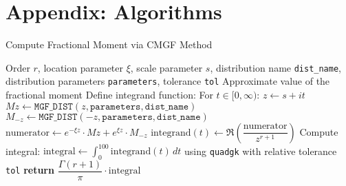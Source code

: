 \section{Appendix: Algorithms}\label{s:app_alg}
\begin{center}
\begin{minipage}{0.9 \textwidth}
\begin{algorithm}[H]
\caption{Compute Fractional Moment via CMGF Method}
\label{alg:cmgf_dist}
\begin{algorithmic}[1]
\REQUIRE Order $r$, location parameter $\xi$, scale parameter $s$, distribution name \texttt{dist\_name}, distribution parameters \texttt{parameters}, tolerance \texttt{tol}
\ENSURE Approximate value of the fractional moment
\STATE Define integrand function:
\STATE \hspace{1em} For $t \in [0, \infty)$:
\STATE \hspace{2em} $z \leftarrow s + it$
\STATE \hspace{2em} $Mz \leftarrow \texttt{MGF\_DIST}(z, \texttt{parameters}, \texttt{dist\_name})$
\STATE \hspace{2em} $M_{-z} \leftarrow \texttt{MGF\_DIST}(-z, \texttt{parameters}, \texttt{dist\_name})$
\STATE \hspace{2em} $\text{numerator} \leftarrow e^{-\xi z} \cdot Mz + e^{\xi z} \cdot M_{-z}$
\STATE \hspace{2em} $\text{integrand}(t) \leftarrow \Re\left(\dfrac{\text{numerator}}{z^{r+1}}\right)$
\STATE Compute integral: $\text{integral} \leftarrow \int_0^{100} \text{integrand}(t)\,dt$ using \texttt{quadgk} with relative tolerance \texttt{tol}
\STATE \textbf{return} $\dfrac{\Gamma(r+1)}{\pi} \cdot \text{integral}$
\end{algorithmic}
\end{algorithm}
\end{minipage}
\end{center}

